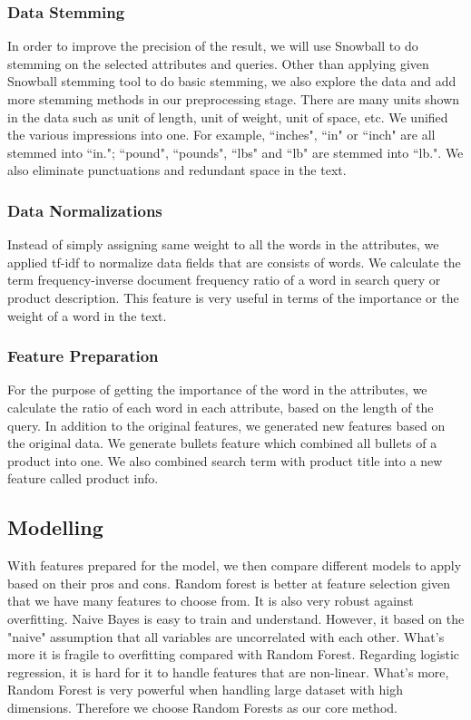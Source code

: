 \documentclass{sig-alternate-05-2015}
\begin{document}
\subsubsection{Data Stemming}
In order to improve the precision of the result, we will use Snowball to do stemming on the selected attributes and queries.\cite{snowball} Other than applying given Snowball stemming tool to do basic stemming, we also explore the data and add more stemming methods in our preprocessing stage. There are many units shown in the data such as unit of length, unit of weight, unit of space, etc. We unified the various impressions into one. For example, ``inches", ``in" or ``inch" are all stemmed into ``in."; ``pound", ``pounds", ``lbs" and ``lb" are stemmed into ``lb.". We also eliminate punctuations and redundant space in the text.

\subsubsection{Data Normalizations}
Instead of simply assigning same weight to all the words in the attributes, we applied tf-idf to normalize data fields that are consists of words. We calculate the term frequency-inverse document frequency ratio of a word in search query or product description.\cite{tf-idf, tf-idf1} This feature is very useful in terms of the importance or the weight of a word in the text.

\subsubsection{Feature Preparation}
For the purpose of getting the importance of the word in the attributes, we calculate the ratio of each word in each attribute, based on the length of the query. In addition to the original features, we generated new features based on the original data. We generate bullets feature which combined all bullets of a product into one. We also combined search term with product title into a new feature called product info. \\

\subsection{Modelling}
With features prepared for the model, we then compare different models to apply based on their pros and cons. Random forest is better at feature selection given that we have many features to choose from.\cite{rf0} It is also very robust against overfitting.\cite{rfwiki, rf1} Naive Bayes is easy to train and understand. However, it based on the "naive" assumption that all variables are uncorrelated with each other. What's more it is fragile to overfitting compared with Random Forest. Regarding logistic regression, it is hard for it to handle features that are non-linear. What's more, Random Forest is very powerful when handling large dataset with high dimensions.\cite{rf2, rf3} Therefore we choose Random Forests as our core method.
\end{document}
